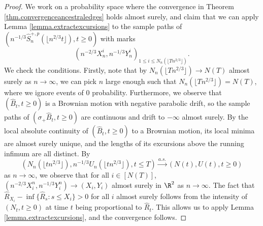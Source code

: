 \begin{proof}
We work on a probability space where the convergence in Theorem \ref{thm.convergenceancestraledges} holds almost surely, and claim that we can apply Lemma \ref{lemma.extractexcursions} to the sample paths of $\left(n^{-1/3}\hat{S}^{+,p}_n\left(\lfloor n^{2/3}t\rfloor\right),t \geq 0\right)$ with marks $$\left(n^{-2/3}X_n^i,n^{-1/3}Y_n^i\right)_{1\leq i\leq N_n\left(\lfloor T n^{2/3}\rfloor\right)}.$$ We check the conditions.
Firstly, note that by $N_n\left(\lfloor T n^{2/3}\rfloor\right)\to N\left(T\right)$ almost surely as $n\to \infty$, we can pick $n$ large enough such that $N_n\left(\lfloor T n^{2/3}\rfloor\right)=N\left(T\right)$, where we ignore events of $0$ probability. Furthermore, we observe that $(\hat{B}_t,t\geq 0)$ is a Brownian motion with negative parabolic drift, so the sample paths of $(\sigma_+\hat{B}_t,t\geq 0)$ are continuous and drift to $-\infty$ almost surely. By the local absolute continuity of $(\hat{B}_t,t\geq 0)$ to a Brownian motion, its local minima are almost surely unique, and the lengths of its excursions above the running infimum are all distinct. By 
$$\left(N_n\left(\lfloor t n^{2/3}\rfloor\right), n^{-1/3}U_n\left(\lfloor t n^{2/3}\rfloor\right), t\leq T\right) \overset{a.s.}{\to}\left(N\left(t\right), U\left(t\right),t\geq 0\right)$$
as $n\to \infty$, we observe that for all $i\in [N(T)]$, $(n^{-2/3}X_i^n,n^{-1/3}Y_i^n)\to (X_i,Y_i)$ almost surely in $\R^2$ as $n\to \infty$. The fact that $\hat{R}_{X_i}-\inf\{\hat{R}_s:s\leq X_i\}>0$ for all $i$ almost surely follows from the intensity of $(N_t,t\geq 0)$ at time $t$ being proportional to $\hat{R}_t$. This allows us to apply Lemma \ref{lemma.extractexcursions}, and the convergence follows.
\end{proof}

